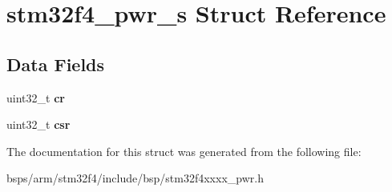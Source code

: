 \hypertarget{structstm32f4__pwr__s}{}\section{stm32f4\+\_\+pwr\+\_\+s Struct Reference}
\label{structstm32f4__pwr__s}
\subsection*{Data Fields}
\begin{DoxyCompactItemize}
\item 
\mbox{\label{structstm32f4__pwr__s_a8f89bd1276a02335d37d99a501d959c0}} 
uint32\+\_\+t {\bfseries cr}
\item 
\mbox{\label{structstm32f4__pwr__s_a2d8cfd05d5c15252fc1383318e34edc1}} 
uint32\+\_\+t {\bfseries csr}
\end{DoxyCompactItemize}


The documentation for this struct was generated from the following file\+:\begin{DoxyCompactItemize}
\item 
bsps/arm/stm32f4/include/bsp/stm32f4xxxx\+\_\+pwr.\+h\end{DoxyCompactItemize}
